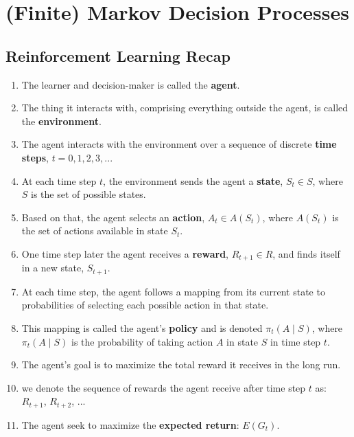 \chapter{(Finite) Markov Decision Processes \cite{medium-introduction-to-reinforcement-learning-rl-part-3-finite-markov-decision-processes-51e1f8d3ddb7}}

\section{Reinforcement Learning Recap}


\begin{enumerate}
    \item The learner and decision-maker is called the \textbf{agent}.
    \item The thing it interacts with, comprising everything outside the agent, is called the \textbf{environment}.
    \item The agent interacts with the environment over a sequence of discrete \textbf{time steps}, $t = 0, 1, 2, 3, ...$
    \item At each time step $t$, the environment sends the agent a \textbf{state}, $S_t \in S$, where $S$ is the set of possible states.
    \item Based on that, the agent selects an \textbf{action}, $A_t \in A(S_t)$, where $A(S_t)$ is the set of actions available in state $S_t$.
    \item One time step later the agent receives a \textbf{reward}, $R_{t+1} \in R$, and finds itself in a new state, $S_{t+1}$.
    \item At each time step, the agent follows a mapping from its current state to probabilities of selecting each possible action in that state.
    \item This mapping is called the agent’s \textbf{policy} and is denoted $\pi_t(A \mid S)$, where $\pi_t(A \mid S)$ is the probability of taking action $A$ in state $S$ in time step $t$.
    \item The agent’s goal is to maximize the total reward it receives in the long run.
    \item we denote the sequence of rewards the agent receive after time step $t$ as: $R_{t+1}$, $R_{t+2}$, ...
    \item The agent seek to maximize the \textbf{expected return}: $E(G_t)$.
    \[
\]
\end{enumerate}
